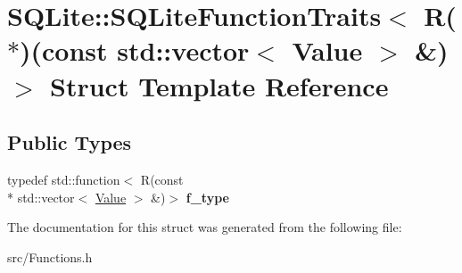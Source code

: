 \hypertarget{struct_s_q_lite_1_1_s_q_lite_function_traits_3_01_r_07_5_08_07const_01std_1_1vector_3_01_value_01_4_01_6_08_4}{\section{S\-Q\-Lite\-:\-:S\-Q\-Lite\-Function\-Traits$<$ R($\ast$)(const std\-:\-:vector$<$ Value $>$ \&)$>$ Struct Template Reference}
\label{struct_s_q_lite_1_1_s_q_lite_function_traits_3_01_r_07_5_08_07const_01std_1_1vector_3_01_value_01_4_01_6_08_4}
}
\subsection*{Public Types}
\begin{DoxyCompactItemize}
\item 
\hypertarget{struct_s_q_lite_1_1_s_q_lite_function_traits_3_01_r_07_5_08_07const_01std_1_1vector_3_01_value_01_4_01_6_08_4_ac182adfa62026a574bfacf9ab4696594}{typedef std\-::function$<$ R(const \\*
std\-::vector$<$ \hyperlink{class_s_q_lite_1_1_value}{Value} $>$ \&)$>$ {\bfseries f\-\_\-type}}\label{struct_s_q_lite_1_1_s_q_lite_function_traits_3_01_r_07_5_08_07const_01std_1_1vector_3_01_value_01_4_01_6_08_4_ac182adfa62026a574bfacf9ab4696594}

\end{DoxyCompactItemize}


The documentation for this struct was generated from the following file\-:\begin{DoxyCompactItemize}
\item 
src/Functions.\-h\end{DoxyCompactItemize}
